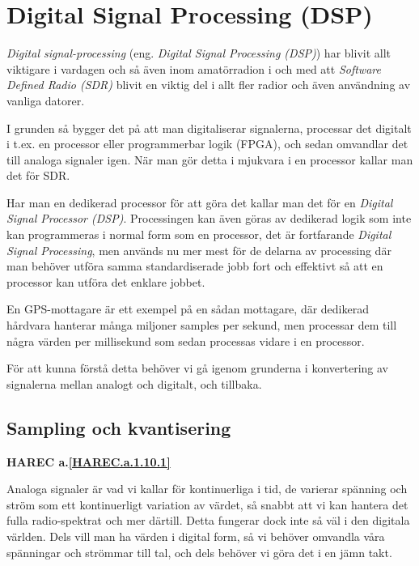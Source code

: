 \section{Digital Signal Processing (DSP)}
\label{DSP}

\emph{Digital signal-processing} (eng. \emph{Digital Signal Processing (DSP)})
har blivit allt viktigare i vardagen och så även inom amatörradion i och med
att \emph{Software Defined Radio (SDR)} blivit en viktig del i allt fler
radior och även användning av vanliga datorer.

I grunden så bygger det på att man digitaliserar signalerna, processar det
digitalt i t.ex. en processor eller programmerbar logik (FPGA), och sedan
omvandlar det till analoga signaler igen. När man gör detta i mjukvara i en
processor kallar man det för SDR.

Har man en dedikerad processor för att göra det kallar man det för en
\emph{Digital Signal Processor (DSP)}. Processingen kan även göras av dedikerad
logik som inte kan programmeras i normal form som en processor, det är
fortfarande \emph{Digital Signal Processing}, men används
nu mer mest för de delarna av processing där man behöver utföra samma
standardiserade jobb fort och effektivt så att en processor kan utföra det
enklare jobbet.

En GPS-mottagare är ett exempel på en sådan mottagare, där dedikerad hårdvara
hanterar många miljoner samples per sekund, men processar dem till några värden
per millisekund som sedan processas vidare i en processor.

För att kunna förstå detta behöver vi gå igenom grunderna i konvertering av
signalerna mellan analogt och digitalt, och tillbaka.

\subsection{Sampling och kvantisering}
\textbf{HAREC a.\ref{HAREC.a.1.10.1}\label{myHAREC.a.1.10.1}}

Analoga signaler är vad vi kallar för kontinuerliga i tid, de varierar spänning
och ström som ett kontinuerligt variation av värdet, så snabbt att vi kan
hantera det fulla radio-spektrat och mer därtill. Detta fungerar dock inte så
väl i den digitala världen. Dels vill man ha värden i digital form, så vi
behöver omvandla våra spänningar och strömmar till tal, och dels behöver vi
göra det i en jämn takt.

